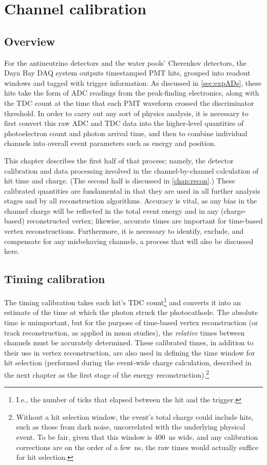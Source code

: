 \documentclass[../thesis.tex]{subfiles}
\begin{document}
\chapter{Channel calibration}
\label{chap:calib}

\section{Overview}

For the antineutrino detectors and the water pools' Cherenkov detectors, the Daya Bay DAQ system outputs timestamped PMT hits, grouped into readout windows and tagged with trigger information. As discussed in \autoref{sec:expADs}, these hits take the form of ADC readings from the peak-finding electronics, along with the TDC count at the time that each PMT waveform crossed the discriminator threshold. In order to carry out any sort of physics analysis, it is necessary to first convert this raw ADC and TDC data into the higher-level quantities of photoelectron count and photon arrival time, and then to combine individual channels into overall event parameters such as energy and position.

This chapter describes the first half of that process; namely, the detector calibration and data processing involved in the channel-by-channel calculation of hit time and charge. (The second half is discussed in \autoref{chap:recon}.) These calibrated quantities are fundamental in that they are used in all further analysis stages and by all reconstruction algorithms. Accuracy is vital, as any bias in the channel charge will be reflected in the total event energy and in any (charge-based) reconstructed vertex; likewise, accurate times are important for time-based vertex reconstructions. Furthermore, it is necessary to identify, exclude, and compensate for any misbehaving channels, a process that will also be discussed here.

\section{Timing calibration}
\label{sec:calibTiming}

The timing calibration takes each hit's TDC count\footnote{I.e., the number of ticks that elapsed between the hit and the trigger.} and converts it into an estimate of the time at which the photon struck the photocathode. The absolute time is unimportant, but for the purpose of time-based vertex reconstruction (or track reconstruction, as applied in muon studies), the \emph{relative} times between channels must be accurately determined. These calibrated times, in addition to their use in vertex reconstruction, are also used in defining the time window for hit selection (performed during the event-wide charge calculation, described in the next chapter as the first stage of the energy reconstruction).\footnote{Without a hit selection window, the event's total charge could include hits, such as those from dark noise, uncorrelated with the underlying physical event. To be fair, given that this window is 400~ns wide, and any calibration corrections are on the order of a few~ns, the raw times would actually suffice for hit selection.}
\end{document}
